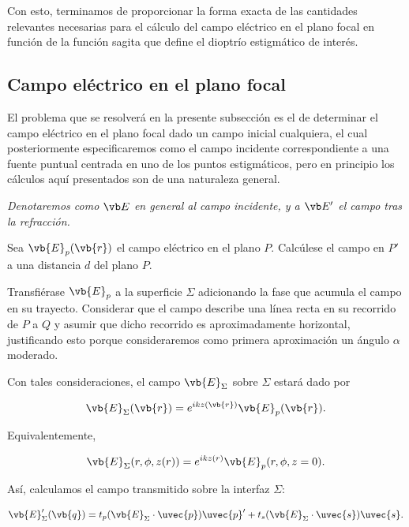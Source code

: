 Con esto, terminamos de proporcionar la forma exacta de las cantidades relevantes necesarias para el cálculo del campo eléctrico en el plano focal en función de la función sagita que define el dioptrío estigmático de interés.

\subsection{Campo eléctrico en el plano focal}

El problema que se resolverá en la presente subsección es el de determinar el campo eléctrico en el plano focal dado un campo inicial cualquiera, el cual posteriormente especificaremos como el campo incidente correspondiente a una fuente puntual centrada en uno de los puntos estigmáticos, pero en principio los cálculos aquí presentados son de una naturaleza general.

\textit{Denotaremos como $\vb E$ en general al campo incidente, y a $\vb E'$ el campo tras la refracción.}

Sea $\vb{E}_p(\vb{r})$ el campo eléctrico en el plano $P$. Calcúlese el campo en $P'$ a una distancia $d$ del plano $P$.

Transfiérase $\vb{E}_p$ a la superficie $\Sigma$ adicionando la fase que acumula el campo en su trayecto. Considerar que el campo describe una línea recta en su recorrido de $P$ a $Q$ y asumir que dicho recorrido es aproximadamente horizontal, justificando esto porque consideraremos como primera aproximación un ángulo $\alpha$ moderado.

Con tales consideraciones, el campo $\vb{E}_{\Sigma}$ sobre $\Sigma$ estará dado por

\begin{equation}
    \vb{E}_{\Sigma}(\vb{r})
    =
    e^{ikz(\vb{r})} \vb{E}_p(\vb{r}).
    \label{eq:Ep_from_E_Sigma}
\end{equation}

Equivalentemente,

\begin{equation}
    \vb{E}_{\Sigma}(r,\phi,z(r))
    =
    e^{ikz(r)} \vb{E}_p(r,\phi,z=0).
\end{equation}

Así, calculamos el campo transmitido sobre la interfaz $\Sigma$:

\begin{equation}
    \vb{E}'_{\Sigma}(\vb{q})
    =
    t_p (\vb{E}_{\Sigma} \cdot \uvec{p}) \uvec{p}'
    +
    t_s (\vb{E}_{\Sigma} \cdot \uvec{s}) \uvec{s}.
\label{eq:E_Sigma_Prime_in_terms_of_E_Sigma}
\end{equation}


